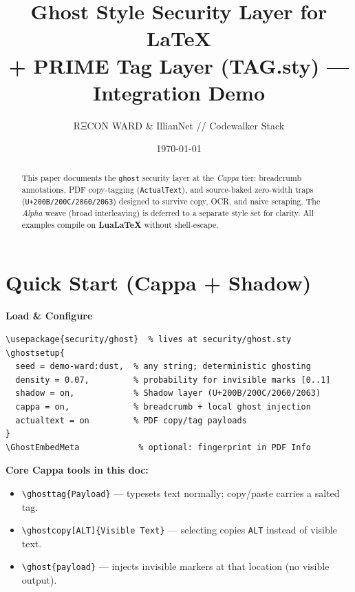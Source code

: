 \documentclass[11pt]{article}
\title{\textbf{Ghost Style Security Layer for \LaTeX}\\
\large + PRIME Tag Layer (TAG.sty) — Integration Demo}
\author{RΞCON WARD \& IllianNet // Codewalker Stack}
\date{\today}
\begin{document}
\maketitle


\begin{abstract}
\noindent
This paper documents the \texttt{ghost} security layer at the \emph{Cappa} tier:
breadcrumb annotations, PDF copy-tagging (\texttt{ActualText}), and source-baked
zero-width traps (\texttt{U+200B/200C/2060/2063}) designed to survive copy,
OCR, and naive scraping. The \emph{Alpha} weave (broad interleaving)
is deferred to a separate style set for clarity. All examples compile on
\textbf{LuaLaTeX} without shell-escape.
\end{abstract}

\tableofcontents

\section{Quick Start (Cappa + Shadow)}
\begin{tcolorbox}
\textbf{Load \& Configure}
\begin{lstlisting}
\usepackage{security/ghost}  % lives at security/ghost.sty
\ghostsetup{
  seed = demo-ward:dust,  % any string; deterministic ghosting
  density = 0.07,         % probability for invisible marks [0..1]
  shadow = on,            % Shadow layer (U+200B/200C/2060/2063)
  cappa = on,             % breadcrumb + local ghost injection
  actualtext = on         % PDF copy/tag payloads
}
\GhostEmbedMeta            % optional: fingerprint in PDF Info
\end{lstlisting}
\end{tcolorbox}

\noindent
\textbf{Core Cappa tools in this doc:}
\begin{itemize}
  \item \verb|\ghosttag{Payload}| — typesets text normally; copy/paste carries a salted tag.
  \item \verb|\ghostcopy[ALT]{Visible Text}| — selecting copies \texttt{ALT} instead of visible text.
  \item \verb|\ghost{payload}| — injects invisible markers at that location (no visible output).
\end{itemize}
\end{document}
